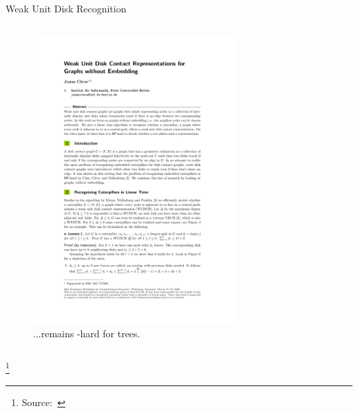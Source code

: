 \documentclass[aspectratio=169,notes]{beamer}
\newcommand\unfootnote[1]{%
  \begingroup
  \renewcommand\thefootnote{}\footnote{#1}%
  \addtocounter{footnote}{-1}%
  \endgroup
}
\begin{document}
\begin{frame}{Weak Unit Disk Recognition}
\begin{columns}
\begin{column}{0.4\textwidth}
\begin{figure}
   \includegraphics[width=0.7\textwidth,page=7,viewport=90 185 630 705,clip]{papers/Cleve2020-WUDC.pdf}
   \caption*{...remains \NP-hard for trees.}
\end{figure}
\end{column}
\end{columns}

\unfootnote{Source:~\cite{Cleve2020}}

\end{frame}
\end{document}
